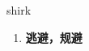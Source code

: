 
\begin{frame}
{\huge shirk}
\begin{center}
\begin{enumerate}\Large
  \item \textbf{逃避，规避}
\end{enumerate}
\end{center}
\end{frame}
